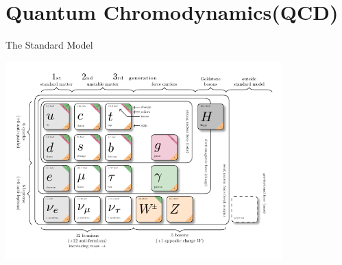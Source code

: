 \documentclass[10pt,show notes on second screen]{beamer}
\begin{document}
\section{Quantum Chromodynamics(QCD)}


\begin{frame}{The Standard Model}
    \begin{center}
        \includegraphics[width=0.8\textwidth]{../figures/illustrations/qcd/standard-model/sm.pdf}
    \end{center}
\end{frame}
\end{document}
